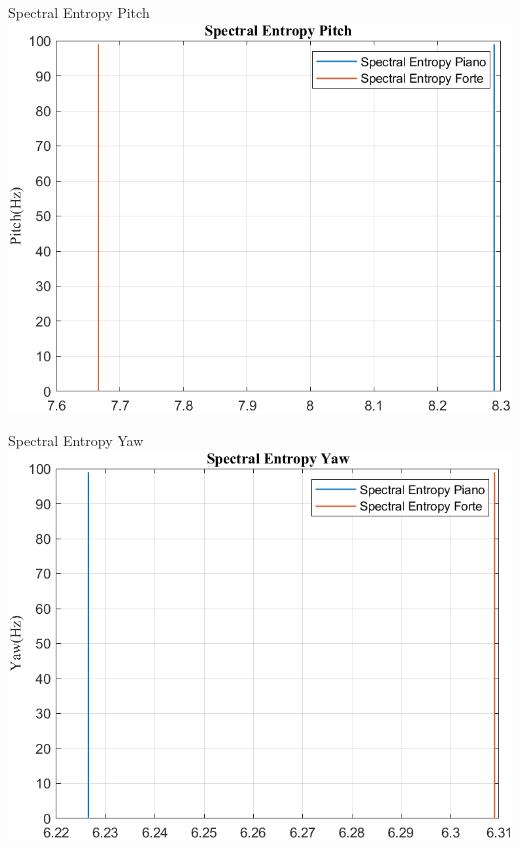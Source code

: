 \documentclass[beamer]{standalone}
\begin{document}
	\begin{frame}{{Spectral Entropy Pitch}}
		\centering\includegraphics[height=.8\textheight]{figure/VAng/Trasformata/Spectral EntropyPitch}
	\end{frame}
	
	\begin{frame}{{Spectral Entropy Yaw}}
		\centering\includegraphics[height=.8\textheight]{figure/VAng/Trasformata/Spectral EntropyYaw}
	\end{frame}
		
\end{document}
